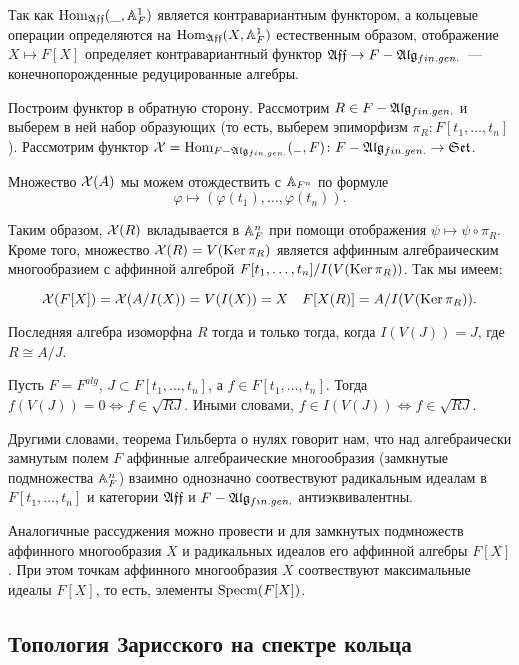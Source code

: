 Так как $\Hom_{\Aff}(\_, \AA_{F}^{1})$ является контравариантным функтором, а кольцевые операции определяются на $\Hom_{\Aff}(X, \AA_{F}^{1} )$ естественным образом, отображение $X \mapsto F[X]$ определяет контравариантный функтор $\Aff \to F-\Alg_{fin.gen.}$~--- конечнопорожденные редуцированные алгебры. 

Построим функтор в обратную сторону. Рассмотрим $R \in F-\Alg_{fin.gen.}$ и выберем в ней набор образующих (то есть, выберем эпиморфизм $\pi_{R}\colon F[t_{1}, \ldots, t_{n}]$). Рассмотрим функтор $\cX = \Hom_{F-\Alg_{fin.gen.}}(_{-}, F)\colon F-\Alg_{fin.gen.} \to \Set$. 

Множество $\cX(A)$ мы можем отождествить с $\AA_{F^{n}}$ по формуле 
\[ \varphi \mapsto (\varphi(t_1), \ldots, \varphi(t_n)). \]

Таким образом, $\cX(R)$ вкладывается в $\AA_{F}^{n}$ при помощи отображения $\psi \mapsto \psi \circ \pi_{R}$. 
Кроме того, множество $\cX(R) = V(\Ker{\pi_{R}})$ является аффинным алгебраическим многообразием с аффинной алгеброй 
$F[t_{1}, \ldots, t_{n}]/I(V(\Ker{\pi_{R}}))$. Так мы имеем: 

\[
	\cX(F[X]) = \cX(A/I(X)) = V(I(X)) = X \quad F[X(R)] = A/I(V(\Ker{\pi_{R}})).
\]

Последняя алгебра изоморфна $R$ тогда и только тогда, когда $I(V(J)) = J$, где $R \cong A/J$.

\begin{theorem}
	Пусть $F = F^{alg}$, $J \subset F[t_{1}, \ldots, t_{n}]$, а $f \in F[t_{1}, \ldots, t_{n}]$. Тогда 
	$f(V(J)) = 0 \Leftrightarrow f \in \sqrt{RJ}$. Иными словами, $f \in I(V(J)) \Leftrightarrow f \in \sqrt{RJ}$.
\end{theorem}

Другими словами, теорема Гильберта о нулях говорит нам, что над алгебраически замнутым полем $F$ аффинные алгебраические многообразия (замкнутые подмножества $\AA_{F}^{n}$) взаимно однозначно соотвествуют радикальным идеалам в $F[t_{1}, \ldots, t_{n}]$ и категории $\Aff$ и $F-\Alg_{fin.gen.}$ антиэквивалентны. 

Аналогичные рассуджения можно провести и для замкнутых подмножеств аффинного многообразия $X$ и радикальных идеалов его аффинной алгебры $F[X]$. При этом точкам аффинного многообразия $X$ соотвествуют максимальные идеалы $F[X]$, то есть, элементы $\Specm(F[X])$.


\subsection{Топология Зарисского на спектре кольца}

